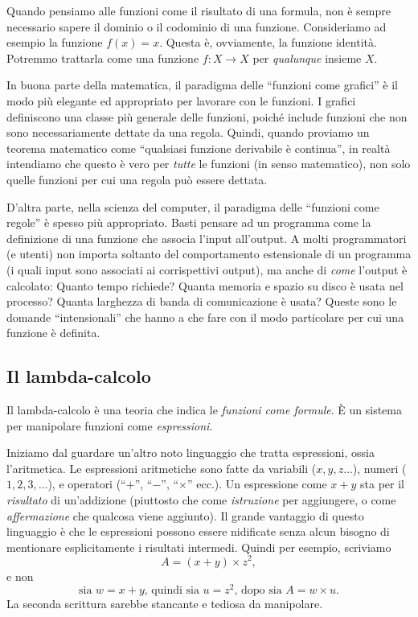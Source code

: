 \documentclass{article}
\begin{document}
Quando pensiamo alle funzioni come il risultato di una formula, non
\`e sempre necessario sapere il dominio o il codominio di una funzione. Consideriamo
ad esempio la funzione $f(x)=x$. Questa \`e, ovviamente, la funzione
identit\`a. Potremmo trattarla come una funzione $f:X\to X$ per {\em qualunque} insieme $X$.

In buona parte della matematica, il paradigma delle 
``funzioni come grafici'' \`e il modo pi\`u elegante ed appropriato per lavorare con le funzioni. 
I grafici definiscono una classe pi\`u generale delle funzioni, poich\'e include
funzioni che non sono necessariamente dettate da una regola. Quindi, quando
proviamo un teorema matematico come ``qualsiasi funzione derivabile
\`e continua'', in realt\`a intendiamo che questo \`e vero per {\em tutte} le funzioni
(in senso matematico), non solo quelle funzioni per cui una regola pu\`o essere dettata.

D'altra parte, nella scienza del computer, il paradigma delle
``funzioni come regole'' \`e spesso pi\`u appropriato. Basti pensare ad un programma 
come la definizione di una funzione che associa l'input all'output. A molti programmatori
(e utenti) non importa soltanto del comportamento estensionale di 
un programma (i quali input sono associati ai corrispettivi output),
ma  anche di {\em come} l'output \`e calcolato: Quanto tempo richiede?
Quanta memoria e spazio su disco \`e usata nel processo? Quanta larghezza di 
banda di comunicazione \`e usata? Queste sono le domande ``intensionali'' che 
hanno a che fare con il modo particolare
per cui una funzione \`e definita.

\subsection{Il lambda-calcolo}

Il lambda-calcolo \`e una teoria che indica le {\em funzioni come formule}. \`E un
sistema per manipolare funzioni come {\em espressioni}.

Iniziamo dal guardare un'altro noto linguaggio che tratta espressioni, ossia l'aritmetica. 
Le espressioni aritmetiche sono fatte da variabili ($x,y,z\ldots$), 
numeri ($1,2,3,\ldots$), e operatori (``$+$'', ``$-$'', ``$\times$'' ecc.). 
Un espressione come $x+y$ sta per il {\em risultato} di un'addizione
(piuttosto che come {\em istruzione} per aggiungere, o come {\em affermazione} 
che qualcosa viene aggiunto). Il grande vantaggio di questo linguaggio 
\`e che le espressioni possono essere nidificate senza alcun bisogno 
di mentionare esplicitamente i risultati intermedi. Quindi
per esempio, scriviamo
\[   A = (x+y)\times z^2,   
\]
e non 
\[   \mbox{sia $w=x+y$, quindi sia $u=z^2$, dopo sia $A=w\times u$.}    
\]
La seconda scrittura sarebbe stancante e tediosa da manipolare.
\end{document}
